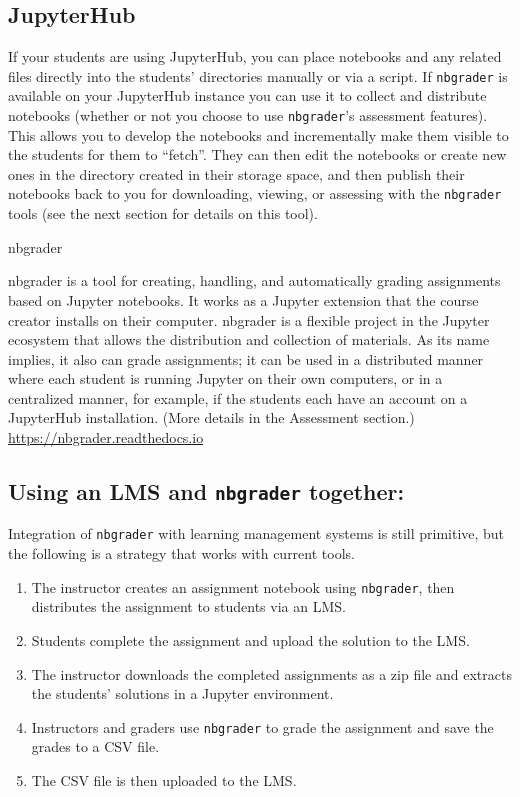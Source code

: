 \documentclass[]{book}
\let\BeginKnitrBlock\begin \let\EndKnitrBlock\end
\begin{document}
\subsection{JupyterHub}\label{jupyterhub}

If your students are using JupyterHub, you can place notebooks and any
related files directly into the students' directories manually or via a
script. If \texttt{nbgrader} is available on your JupyterHub instance
you can use it to collect and distribute notebooks (whether or not you
choose to use \texttt{nbgrader}'s assessment features). This allows you
to develop the notebooks and incrementally make them visible to the
students for them to ``fetch''. They can then edit the notebooks or
create new ones in the directory created in their storage space, and
then publish their notebooks back to you for downloading, viewing, or
assessing with the \texttt{nbgrader} tools (see the next section for
details on this tool).

\BeginKnitrBlock{rmdnote}
nbgrader

nbgrader is a tool for creating, handling, and automatically grading
assignments based on Jupyter notebooks. It works as a Jupyter extension
that the course creator installs on their computer. nbgrader is a
flexible project in the Jupyter ecosystem that allows the distribution
and collection of materials. As its name implies, it also can grade
assignments; it can be used in a distributed manner where each student
is running Jupyter on their own computers, or in a centralized manner,
for example, if the students each have an account on a JupyterHub
installation. (More details in the Assessment section.)
\url{https://nbgrader.readthedocs.io}
\EndKnitrBlock{rmdnote}

\subsection{\texorpdfstring{Using an LMS and \texttt{nbgrader}
together:}{Using an LMS and nbgrader together:}}\label{using-an-lms-and-nbgrader-together}

Integration of \texttt{nbgrader} with learning management systems is
still primitive, but the following is a strategy that works with current
tools.

\begin{enumerate}
\def\labelenumi{\arabic{enumi}.}
\item
  The instructor creates an assignment notebook using \texttt{nbgrader},
  then distributes the assignment to students via an LMS.
\item
  Students complete the assignment and upload the solution to the LMS.
\item
  The instructor downloads the completed assignments as a zip file and
  extracts the students' solutions in a Jupyter environment.
\item
  Instructors and graders use \texttt{nbgrader} to grade the assignment
  and save the grades to a CSV file.
\item
  The CSV file is then uploaded to the LMS.
\end{enumerate}
\end{document}
